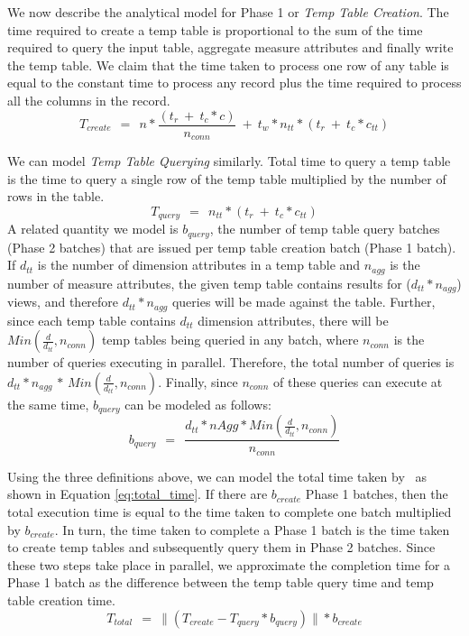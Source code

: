 We now describe the analytical model for Phase 1 or {\it Temp Table Creation}.
The time required to create a temp table is proportional to the sum of the time
required to query the input table, aggregate measure attributes and finally
write the temp table. We claim that the time taken to process one row of any
table is equal to the constant time to process any record plus the time required
to process all the columns in the record.
\begin{equation*}
T_{create}\ \ =\ \ n \ast \frac{(t_r\ +\ t_c \ast c)}{n_{conn}} \ +\ t_w
\ast n_{tt} \ast (t_r\ +\ t_c \ast c_{tt})
\label{eq:create_time}
\end{equation*}

We can model {\it Temp Table Querying} similarly. Total time to query a temp
table is the time to query a single row of the temp table multiplied by the
number of rows in the table.
\begin{equation*}
T_{query}\ \ =\ \ n_{tt} \ast (t_r\ +\ t_c \ast c_{tt}) 
\label{eq:query_time}
\end{equation*}
A related quantity we model is $b_{query}$, the number of temp table query
batches (Phase 2 batches) that are issued per temp table creation batch (Phase 1 batch).
If $d_{tt}$ is the number of dimension attributes in a temp table and $n_{agg}$
is the number of measure attributes, the given temp table contains results
for ($d_{tt} \ast n_{agg}$) views, and therefore $d_{tt} \ast n_{agg}$ queries
will be made against the table. Further, since each temp table contains $d_{tt}$
dimension attributes, there will be $Min(\frac{d}{d_{tt}}, n_{conn})$ temp
tables being queried in any batch, where $n_{conn}$ is the number of queries executing
in parallel. Therefore, the total number of queries is $d_{tt} \ast n_{agg}$
$\ast$ $Min(\frac{d}{d_{tt}}, n_{conn})$. Finally, since $n_{conn}$ of these queries
can execute at the same time, $b_{query}$ can be modeled as follows:
\begin{equation*}
b_{query}\ \ =\ \ \frac{d_{tt} \ast nAgg \ast Min(\frac{d}{d_{tt}},
n_{conn})}{n_{conn}}
\end{equation*}

Using the three definitions above, we can model the total time taken by \VizRecDB\
as shown in Equation \ref{eq:total_time}. If there are $b_{create}$ Phase 1
batches, then the total execution time is equal to the time taken to complete
one batch multiplied by $b_{create}$. In turn, the time taken to complete a
Phase 1 batch is the time taken to create temp tables and subsequently query
them in Phase 2 batches.
Since these two steps take place in parallel, we approximate the completion time
for a Phase 1 batch as the difference between the temp table query time and temp
table creation time.
\begin{equation*}
T_{total}\ \ =\ \|(T_{create} - T_{query} \ast b_{query})\| \ast b_{create}
\label{eq:total_time}
\end{equation*}


